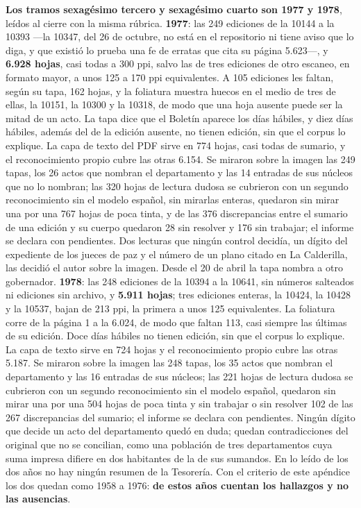 \textbf{Los tramos sexagésimo tercero y sexagésimo cuarto son 1977 y 1978}, leídos al cierre con la misma rúbrica. \textbf{1977}: las 249 ediciones de la 10144 a la 10393 ---la 10347, del 26 de octubre, no está en el repositorio ni tiene aviso que lo diga, y que existió lo prueba una fe de erratas que cita su página 5.623---, y \textbf{6.928 hojas}, casi todas a 300 ppi, salvo las de tres ediciones de otro escaneo, en formato mayor, a unos 125 a 170 ppi equivalentes. A 105 ediciones les faltan, según su tapa, 162 hojas, y la foliatura muestra huecos en el medio de tres de ellas, la 10151, la 10300 y la 10318, de modo que una hoja ausente puede ser la mitad de un acto. La tapa dice que el Boletín aparece los días hábiles, y diez días hábiles, además del de la edición ausente, no tienen edición, sin que el corpus lo explique. La capa de texto del PDF sirve en 774 hojas, casi todas de sumario, y el reconocimiento propio cubre las otras 6.154. Se miraron sobre la imagen las 249 tapas, los 26 actos que nombran el departamento y las 14 entradas de sus núcleos que no lo nombran; las 320 hojas de lectura dudosa se cubrieron con un segundo reconocimiento sin el modelo español, sin mirarlas enteras, quedaron sin mirar una por una 767 hojas de poca tinta, y de las 376 discrepancias entre el sumario de una edición y su cuerpo quedaron 28 sin resolver y 176 sin trabajar; el informe se declara con pendientes. Dos lecturas que ningún control decidía, un dígito del expediente de los jueces de paz y el número de un plano citado en La Calderilla, las decidió el autor sobre la imagen. Desde el 20 de abril la tapa nombra a otro gobernador. \textbf{1978}: las 248 ediciones de la 10394 a la 10641, sin números salteados ni ediciones sin archivo, y \textbf{5.911 hojas}; tres ediciones enteras, la 10424, la 10428 y la 10537, bajan de 213 ppi, la primera a unos 125 equivalentes. La foliatura corre de la página 1 a la 6.024, de modo que faltan 113, casi siempre las últimas de su edición. Doce días hábiles no tienen edición, sin que el corpus lo explique. La capa de texto sirve en 724 hojas y el reconocimiento propio cubre las otras 5.187. Se miraron sobre la imagen las 248 tapas, los 35 actos que nombran el departamento y las 16 entradas de sus núcleos; las 221 hojas de lectura dudosa se cubrieron con un segundo reconocimiento sin el modelo español, quedaron sin mirar una por una 504 hojas de poca tinta y sin trabajar o sin resolver 102 de las 267 discrepancias del sumario; el informe se declara con pendientes. Ningún dígito que decide un acto del departamento quedó en duda; quedan contradicciones del original que no se concilian, como una población de tres departamentos cuya suma impresa difiere en dos habitantes de la de sus sumandos. En lo leído de los dos años no hay ningún resumen de la Tesorería. Con el criterio de este apéndice los dos quedan como 1958 a 1976: \textbf{de estos años cuentan los hallazgos y no las ausencias}.

